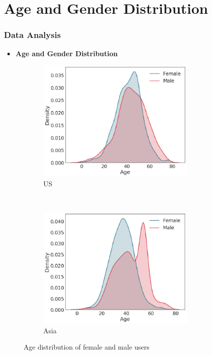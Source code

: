 \documentclass{beamer}
\begin{document}
	\section{Age and Gender Distribution}
	\begin{frame}
		\frametitle{Data Analysis}
		\begin{itemize}
			\item \textbf{Age and Gender Distribution}\pause
		\end{itemize}
		\begin{figure}[h]
			\centering
			\begin{subfigure}{0.45\textwidth}
				\includegraphics[width=0.85\textwidth]{SS1}
				\caption{US}
			\end{subfigure} \pause
			~
			\begin{subfigure}{0.45\textwidth}
				\includegraphics[width=0.85\textwidth]{SS2}
				\caption{Asia}
			\end{subfigure}
			\caption{Age distribution of female and male users}
		\end{figure}
		
	\end{frame}
\end{document}
